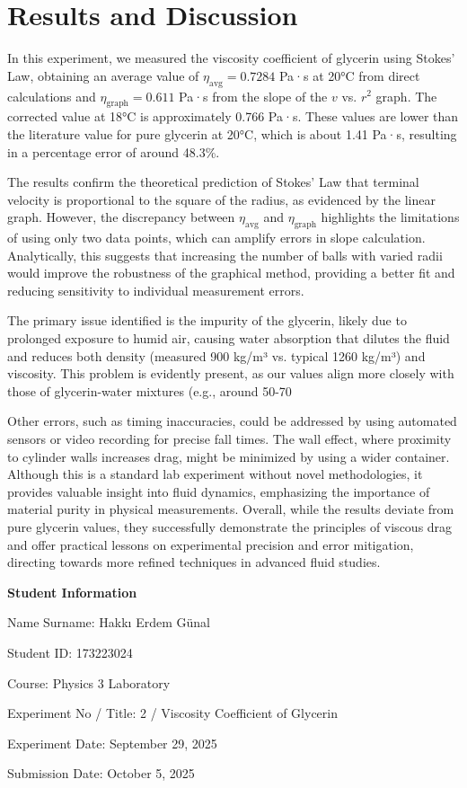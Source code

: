 \documentclass[12pt, a4paper]{article}
\begin{document}
\section{Results and Discussion}
In this experiment, we measured the viscosity coefficient of glycerin using Stokes' Law, obtaining an average value of $\eta_{\text{avg}} = 0.7284$ Pa·s at 20°C from direct calculations and $\eta_{\text{graph}} = 0.611$ Pa·s from the slope of the $v$ vs. $r^2$ graph. The corrected value at 18°C is approximately 0.766 Pa·s. These values are lower than the literature value for pure glycerin at 20°C, which is about 1.41 Pa·s, resulting in a percentage error of around 48.3\%.

The results confirm the theoretical prediction of Stokes' Law that terminal velocity is proportional to the square of the radius, as evidenced by the linear graph. However, the discrepancy between $\eta_{\text{avg}}$ and $\eta_{\text{graph}}$ highlights the limitations of using only two data points, which can amplify errors in slope calculation. Analytically, this suggests that increasing the number of balls with varied radii would improve the robustness of the graphical method, providing a better fit and reducing sensitivity to individual measurement errors.

The primary issue identified is the impurity of the glycerin, likely due to prolonged exposure to humid air, causing water absorption that dilutes the fluid and reduces both density (measured 900 kg/m³ vs. typical 1260 kg/m³) and viscosity. This problem is evidently present, as our values align more closely with those of glycerin-water mixtures (e.g., around 50-70%

Other errors, such as timing inaccuracies, could be addressed by using automated sensors or video recording for precise fall times. The wall effect, where proximity to cylinder walls increases drag, might be minimized by using a wider container. Although this is a standard lab experiment without novel methodologies, it provides valuable insight into fluid dynamics, emphasizing the importance of material purity in physical measurements. Overall, while the results deviate from pure glycerin values, they successfully demonstrate the principles of viscous drag and offer practical lessons on experimental precision and error mitigation, directing towards more refined techniques in advanced fluid studies.

\newpage

\textbf{Student Information}

Name Surname: Hakkı Erdem Günal

Student ID: 173223024

Course: Physics 3 Laboratory

Experiment No / Title: 2 / Viscosity Coefficient of Glycerin

Experiment Date: September 29, 2025

Submission Date: October 5, 2025
\end{document}
